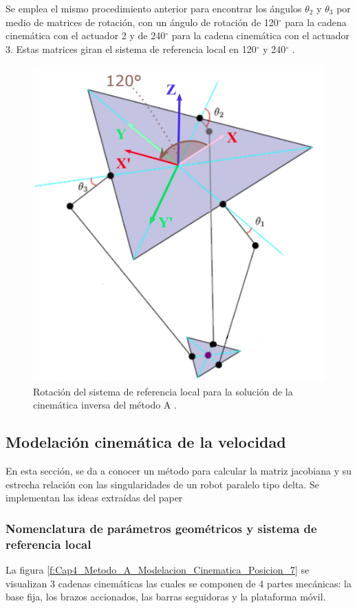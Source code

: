 Se emplea el mismo procedimiento anterior para encontrar los ángulos  \(  \theta _{2} \)  y  \(  \theta _{3} \)  por medio de matrices de rotación, con un ángulo de rotación de 120$ ^{\circ} $  para la cadena cinemática con el actuador 2 y de 240$ ^{\circ} $  para la cadena cinemática con el actuador 3. Estas matrices giran el sistema de referencia local en 120$ ^{\circ} $  y 240$ ^{\circ} $ . 

        \begin{figure}[htb]
             \centering
             \includegraphics[width=0.49\linewidth]{Main/Chapter4/Images4/DIBUJO5.jpg}
              \caption{Rotación del sistema de referencia local para la solución de la cinemática inversa del método A \cite{Diseno_e_implementacion_de_un_sistema_de_control_para_la_representacion_grafica_a_partir_de_imagenes}.}
              \label{f:Cap4_Metodo_A_Modelacion_Cinematica_Posicion_6}
        \end{figure}

        \newpage

    \subsection{Modelación cinemática de la velocidad}\label{ma_cvel}
        En esta sección, se da a conocer un método para calcular la matriz jacobiana y su estrecha relación con las singularidades de un robot paralelo tipo delta. Se implementan las ideas extraídas del paper \cite{Hsu_modelling_ai}
    
        \subsubsection{Nomenclatura de parámetros geométricos y sistema de referencia local}
        
        La figura \ref{f:Cap4_Metodo_A_Modelacion_Cinematica_Posicion_7} se visualizan 3 cadenas cinemáticas las cuales se componen de 4 partes mecánicas: la base fija, los brazos accionados, las barras seguidoras y la plataforma móvil.
        
